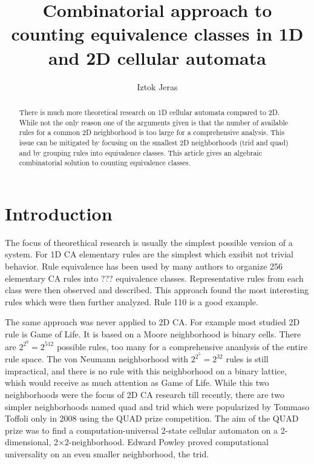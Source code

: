 \documentclass{ijuc}
\begin{document}
\title{Combinatorial approach to counting equivalence classes in 1D and 2D cellular automata}
\author{Iztok Jeras}
\def\received{Received 17 December 2004; In final form 1 April 2005}

\maketitle

\begin{abstract}
There is much more theoretical research on 1D cellular automata compared to 2D.
While not the only reason one of the arguments given is that the number of
available rules for a common 2D neighborhood is too large for a comprehensive
analysis. This issue can be mitigated by focusing on the smallest 2D neighborhoods
(trid and quad) and by grouping rules into equivalence classes. This article
gives an algebraic combinatorial solution to counting equivalence classes.
\end{abstract}


\section{Introduction}

The focus of theorethical research is usually the simplest possible version of a system.
For 1D CA elementary rules are the simplest which exsibit not trivial behavior. Rule
equivalence has been used by many authors to organize 256 elementary CA rules into ???
equivalence classes. Representative rules from each class were then observed and described.
This approach found the most interesting rules which were then further analyzed. Rule 110
is a good example.

The same approach was never applied to 2D CA. For example most studied 2D rule is Game of Life.
It is based on a Moore neighborhood is binary cells. There are $2^{2^9}=2^512$ possible rules,
too many for a comprehensive ananlysis of the entire rule space. The von Neumann neighborhood
with $2^{2^5}=2^32$ rules is still impractical, and there is no rule with this neighborhood on
a binary lattice, whish would receive as much attention as Game of Life. While this two
neighborhoods were the focus of 2D CA research till recently, there are two simpler neighborhoods
named quad and trid which were popularized by Tommaso Toffoli only in 2008 using the QUAD prize competition.
The aim of the QUAD prize was to find a computation-universal 2-state cellular automaton on a 2-dimensional,
2×2-neighborhood. Edward Powley proved computational universality on an even smaller neighborhood, the trid.
\end{document}
